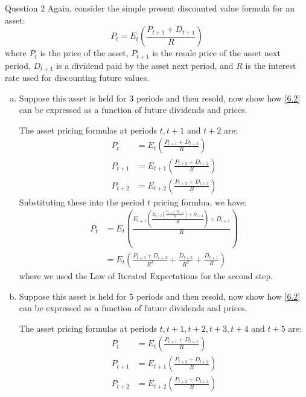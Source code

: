 \documentclass[a4paper]{article}
\newif\IfInSansMode
\begin{document}
	\begin{questionbox}{Question 2}
		Again, consider the simple present discounted value formula for an asset:
		\begin{equation}
			P_t = E_t \left( \frac{P_{t+1} + D_{t+1}}{R} \right) \label{6.2}
		\end{equation}
		where \( P_t \) is the price of the asset, \( P_{t+1} \) is the resale price of the asset next period, \( D_{t+1} \) is a dividend paid by the asset next period, and \( R \) is the interest rate used for discounting future values.
		\begin{enumerate}[(a)]
			\item Suppose this asset is held for 3 periods and then resold, now show how \cref*{6.2} can be expressed as a function of future dividends and prices.
			\begin{explanationbox}
				The asset pricing formulas at periods \( t,t+1 \) and \( t+2 \) are:
				\begin{align*}
					P_t &= E_t \left( \frac{P_{t+1} + D_{t+1}}{R} \right)\\
					P_{t+1} &= E_{t+1} \left( \frac{P_{t+2} + D_{t+2}}{R} \right)\\
					P_{t+2} &= E_{t+2} \left( \frac{P_{t+3} + D_{t+3}}{R} \right)
				\end{align*}
				Substituting these into the period \( t \) pricing formlua, we have:
				\begin{align*}
					P_t &= E_t \left( \frac{E_{t+1} \left( \frac{E_{t+2} \left( \frac{P_{t+3} + D_{t+3}}{R} \right) + D_{t+2}}{R} \right) + D_{t+1}}{R} \right)\\
					&= E_t \left( \frac{P_{t+3} + D_{t+3}}{R^3} + \frac{D_{t+2}}{R^2} + \frac{D_{t+1}}{R} \right)
				\end{align*}
				where we used the Law of Iterated Expectations for the second step.
			\end{explanationbox}
			\item Suppose this asset is held for 5 periods and then resold, now show how \cref{6.2} can be expressed as a function of future dividends and prices.
			\begin{explanationbox}
				The asset pricing formulas at periods \( t,t+1,t+2,t+3,t+4 \) and \( t+5 \) are:
				\begin{align*}
					P_t &= E_t \left( \frac{P_{t+1} + D_{t+1}}{R} \right)\\
					P_{t+1} &= E_{t+1} \left( \frac{P_{t+2} + D_{t+2}}{R} \right)\\
					P_{t+2} &= E_{t+2} \left( \frac{P_{t+3} + D_{t+3}}{R} \right)\\

\end{align*}
\end{explanationbox}
\end{enumerate}
\end{questionbox}
\end{document}
